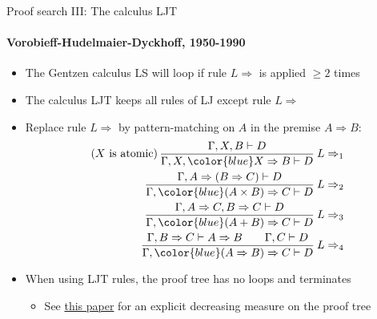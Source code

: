 \documentclass[english]{beamer}
\begin{document}
\begin{frame}{Proof search III: The calculus LJT}


\framesubtitle{Vorobieff-Hudelmaier-Dyckhoff, 1950-1990}
\begin{itemize}
\item The Gentzen calculus LS will loop if rule $L\Rightarrow$ is applied
$\geq2$ times
\item The calculus LJT keeps all rules of LJ except rule $L\Rightarrow$
\item Replace rule $L\Rightarrow$ by pattern-matching on $A$ in the premise
$A\Rightarrow B$:
\begin{align*}
\text{(}X\text{ is atomic)\,}\frac{\Gamma,X,B\vdash D}{\Gamma,X,{\color{blue}X\Rightarrow B}\vdash D}\:L\Rightarrow_{1}\\
\frac{\Gamma,A\Rightarrow(B\Rightarrow C)\vdash D}{\Gamma,{\color{blue}(A\times B)\Rightarrow C}\vdash D}\:L\Rightarrow_{2}\\
\frac{\Gamma,A\Rightarrow C,B\Rightarrow C\vdash D}{\Gamma,{\color{blue}(A+B)\Rightarrow C}\vdash D}\:L\Rightarrow_{3}\\
\frac{\Gamma,B\Rightarrow C\vdash A\Rightarrow B\quad\quad\Gamma,C\vdash D}{\Gamma,{\color{blue}(A\Rightarrow B)\Rightarrow C}\vdash D}\:L\Rightarrow_{4}
\end{align*}
\item When using LJT rules, the proof tree has no loops and terminates
\begin{itemize}
\item See \href{http://citeseer.ist.psu.edu/viewdoc/summary?doi=10.1.1.35.2618}{this paper}
for an explicit decreasing measure on the proof tree
\end{itemize}
\end{itemize}
\end{frame}
\end{document}
